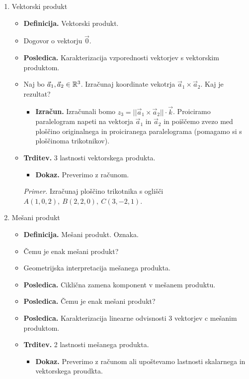 \begin{enumerate}
    \newpage
    \item Vektorski produkt
    \begin{itemize}
        \item \colorbox{purple!30}{\textbf{Definicija.}} Vektorski produkt.
        \item Dogovor o vektorju $\vec{0}$.
        \item \colorbox{orange!30}{\textbf{Posledica.}} Karakterizacija vzporednosti vektorjev s vektorskim produktom.
        \item Naj bo $\vec{a}_1, \vec{a}_2 \in \mathbb{R}^3$. Izračunaj koordinate vekotrja $\vec{a}_1 \times \vec{a}_2$. Kaj je rezultat?
        \begin{itemize}
            \item \colorbox{green!30}{\textbf{Izračun.}} Izračunali bomo $z_3 = ||\vec{a}_1 \times \vec{a}_2|| \cdot \vec{k}$. Proiciramo paralelogram napeti na vektorja $\vec{a}_1$ in $\vec{a}_2$ in poiščemo zvezo med ploščino originalnega in proiciranega paralelograma (pomagamo si s ploščinoma trikotnikov).
        \end{itemize}
        \item \colorbox{blue!30}{\textbf{Trditev.}} 3 lastnosti vektorskega produkta.
        \begin{itemize}
            \item \colorbox{green!30}{\textbf{Dokaz.}} Preverimo z računom.
        \end{itemize}
        \colorbox{yellow!30}{\emph{Primer.}} Izračunaj ploščino trikotnika  s oglišči $A(1,0,2), \ B(2,2,0), \ C(3,-2,1)$.
    \end{itemize}

    \item Mešani produkt
    \begin{itemize}
        \item \colorbox{purple!30}{\textbf{Definicija.}} Mešani produkt. Oznaka.
        \item Čemu je enak mešani produkt?
        \item Geometrijska interpretacija mešanega produkta.
        \item \colorbox{orange!30}{\textbf{Posledica.}} Ciklična zamena komponent v mešanem produktu.
        \item \colorbox{orange!30}{\textbf{Posledica.}} Čemu je enak mešani produkt?
        \item \colorbox{orange!30}{\textbf{Posledica.}} Karakterizacija linearne odvisnosti 3 vektorjev c mešanim produktom.
        \item \colorbox{blue!30}{\textbf{Trditev.}} 2 lastnosti mešanega produkta.
        \begin{itemize}
            \item \colorbox{green!30}{\textbf{Dokaz.}} Preverimo z računom ali upoštevamo lastnosti skalarnega in vektorskega proudkta.
        \end{itemize}
    \end{itemize}


\end{enumerate}
